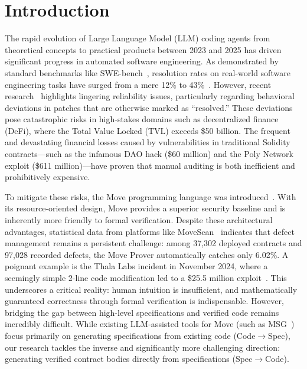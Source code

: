 \section{Introduction}\label{sec:intro}

The rapid evolution of Large Language Model (LLM) coding agents from theoretical concepts to practical products between 2023 and 2025 has driven significant progress in automated software engineering. As demonstrated by standard benchmarks like SWE-bench~\cite{jimenez2024swebench}, resolution rates on real-world software engineering tasks have surged from a mere 12\% to 43\%~\cite{yang2024sweagent}. However, recent research~\cite{wang2026patchdiff} highlights lingering reliability issues, particularly regarding behavioral deviations in patches that are otherwise marked as ``resolved.'' These deviations pose catastrophic risks in high-stakes domains such as decentralized finance (DeFi), where the Total Value Locked (TVL) exceeds \$50 billion. The frequent and devastating financial losses caused by vulnerabilities in traditional Solidity contracts---such as the infamous DAO hack (\$60 million) and the Poly Network exploit (\$611 million)---have proven that manual auditing is both inefficient and prohibitively expensive.

To mitigate these risks, the Move programming language was introduced~\cite{blackshear2019move}. With its resource-oriented design, Move provides a superior security baseline and is inherently more friendly to formal verification. Despite these architectural advantages, statistical data from platforms like MoveScan~\cite{song2024movescan} indicates that defect management remains a persistent challenge: among 37,302 deployed contracts and 97,028 recorded defects, the Move Prover automatically catches only 6.02\%. A poignant example is the Thala Labs incident in November 2024, where a seemingly simple 2-line code modification led to a \$25.5 million exploit~\cite{halborn2024thala}. This underscores a critical reality: human intuition is insufficient, and mathematically guaranteed correctness through formal verification is indispensable. However, bridging the gap between high-level specifications and verified code remains incredibly difficult. While existing LLM-assisted tools for Move (such as MSG~\cite{fu2025msg}) focus primarily on generating specifications from existing code (Code$\rightarrow$Spec), our research tackles the inverse and significantly more challenging direction: generating verified contract bodies directly from specifications (Spec$\rightarrow$Code).

